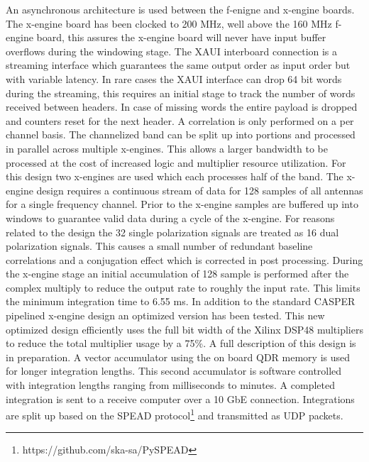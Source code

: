 \documentclass[useAMS,macros,usenatbib,onecolumn]{mn2e}
\begin{document}
An asynchronous architecture is used between the f-enigne and x-engine boards.
The x-engine board has been clocked to 200 MHz, well above the 160 MHz f-engine board, this assures the x-engine board will never have input buffer overflows during the windowing stage.
The XAUI interboard connection is a streaming interface which guarantees the same output order as input order but with variable latency.
In rare cases the XAUI interface can drop 64 bit words during the streaming, this requires an initial stage to track the number of words received between headers.
In case of missing words the entire payload is dropped and counters reset for the next header.
A correlation is only performed on a per channel basis.
The channelized band can be split up into portions and processed in parallel across multiple x-engines.
This allows a larger bandwidth to be processed at the cost of increased logic and multiplier resource utilization.
For this design two x-engines are used which each processes half of the band.
The x-engine design requires a continuous stream of data for 128 samples of all antennas for a single frequency channel.
Prior to the x-engine samples are buffered up into windows to guarantee valid data during a cycle of the x-engine.
For reasons related to the design the 32 single polarization signals are treated as 16 dual polarization signals.
This causes a small number of redundant baseline correlations and a conjugation effect which is corrected in post processing.
During the x-engine stage an initial accumulation of 128 sample is performed after the complex multiply to reduce the output rate to roughly the input rate.
This limits the minimum integration time to 6.55 ms.
In addition to the standard CASPER pipelined x-engine design an optimized version has been tested.
This new optimized design efficiently uses the full bit width of the Xilinx DSP48 multipliers to reduce the total multiplier usage by a 75\%.
A full description of this design is in preparation.
A vector accumulator using the on board QDR memory is used for longer integration lengths.
This second accumulator is software controlled with integration lengths ranging from milliseconds to minutes.
A completed integration is sent to a receive computer over a 10 GbE connection.
Integrations are split up based on the SPEAD protocol\footnote{https://github.com/ska-sa/PySPEAD} and transmitted as UDP packets.
\end{document}
